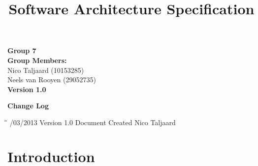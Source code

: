 \documentclass[12pt]{article}
\title{Software Architecture Specification}
\begin{document}

\maketitle

\vspace{4em}

\begin{center}%

  \LARGE {\bf Group 7}\\[2em]
  \LARGE {\bf Group Members:}\\[1em]
  \large
      Nico Taljaard			(10153285)	\\
      Neels van Rooyen		(29052735)	\\[6em]
      
      {\bf Version 1.0}
    
\end{center}%

\newpage

{\LARGE \bf Change Log}\\[2em]

\begin{tabbing}
\hspace*{3cm}\=\hspace*{3cm}\=\hspace*{8cm}\=\hspace*{3cm} /03/2013 \> Version 1.0 \> Document Created \> Nico Taljaard\\

\end{tabbing}

\newpage


\tableofcontents

\newpage


\section{Introduction}
\end{document}
